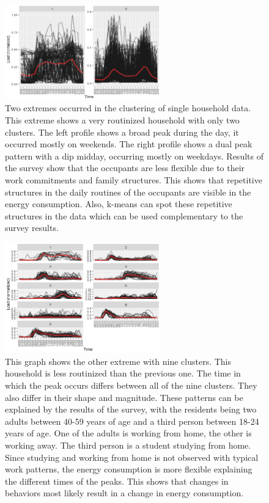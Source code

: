 \begin{figure}
    \centering
    \includegraphics[width=0.6\textwidth]{figures/malatesta_hsop/malatesta_routinisedHousehold.jpg}
    \caption{Two extremes occurred in the clustering of single household data.
    This extreme shows a very routinized household with only two clusters.
    The left profile shows a broad peak during the day, it occurred mostly on weekends.
    The right profile shows a dual peak pattern with a dip midday, occurring mostly on weekdays.
    Results of the survey show that the occupants are less flexible due to their work commitments and family structures.
    This shows that repetitive structures in the daily routines of the occupants are visible in the energy consumption.
    Also, k-means can spot these repetitive structures in the data which can be used complementary to the survey results.
    }
    \label{fig:routinized_household}
\end{figure}

\begin{figure}
    \centering
    \includegraphics[width=0.6\textwidth]{figures/malatesta_hsop/malatesta_unroutinisedHousehold.jpg}
    \caption{This graph shows the other extreme with nine clusters.
    This household is less routinized than the previous one.
    The time in which the peak occurs differs between all of the nine clusters.
    They also differ in their shape and magnitude.
    These patterns can be explained by the results of the survey, with the residents being two adults between 40-59 years of age and a third person between 18-24 years of age.
    One of the adults is working from home, the other is working away.
    The third person is a student studying from home.
    Since studying and working from home is not observed with typical work patterns, the energy consumption is more flexible explaining the different times of the peaks.
    This shows that changes in behaviors most likely result in a change in energy consumption.
    }
    \label{fig:non_routinized_household}
\end{figure}




